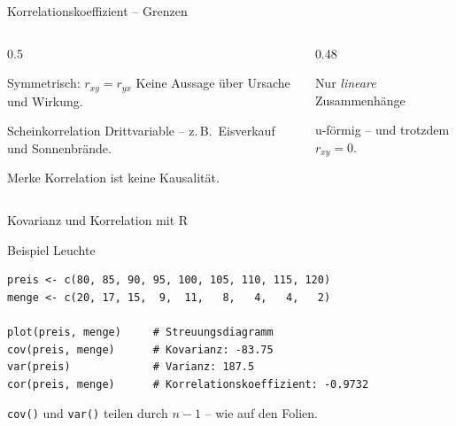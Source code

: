 \documentclass[aspectratio=169,11pt]{beamer}
\begin{document}
\begin{frame}{Korrelationskoeffizient -- Grenzen}
  \begin{columns}[T]
    \begin{column}{0.5\textwidth}
      \begin{alertblock}{Symmetrisch: $r_{xy} = r_{yx}$}
        Keine Aussage über Ursache und Wirkung.
      \end{alertblock}
      \begin{alertblock}{Scheinkorrelation}
        Drittvariable -- z.\,B.\ Eisverkauf und Sonnenbrände.
      \end{alertblock}
      \begin{block}{Merke}
        Korrelation ist keine Kausalität.
      \end{block}
    \end{column}
    \begin{column}{0.48\textwidth}
      \begin{alertblock}{Nur \emph{lineare} Zusammenhänge}
        \begin{center}
        \end{center}
        u-förmig -- und trotzdem $r_{xy} = 0$.
      \end{alertblock}
    \end{column}
  \end{columns}
\end{frame}


\begin{frame}[fragile]{Kovarianz und Korrelation mit R}
  \begin{block}{Beispiel Leuchte}
\begin{lstlisting}
preis <- c(80, 85, 90, 95, 100, 105, 110, 115, 120)
menge <- c(20, 17, 15,  9,  11,   8,   4,   4,   2)

plot(preis, menge)     # Streuungsdiagramm
cov(preis, menge)      # Kovarianz: -83.75
var(preis)             # Varianz: 187.5
cor(preis, menge)      # Korrelationskoeffizient: -0.9732
\end{lstlisting}
  \end{block}
  \footnotesize \texttt{cov()} und \texttt{var()} teilen durch $n - 1$ -- wie auf den Folien.
\end{frame}
\end{document}

